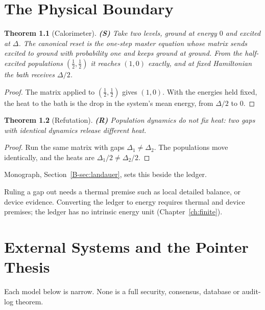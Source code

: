 \documentclass[11pt, a4paper]{report}
\theoremstyle{definition}
\theoremstyle{plain}
\newtheorem{theorem}{Theorem}[chapter]
\begin{document}
\chapter{The Physical Boundary}\label{ch:physics}

\begin{theorem}[Calorimeter] \textbf{(S)}
Take two levels, ground at energy $0$ and excited at $\Delta$. The canonical reset is the one-step
master equation whose matrix sends excited to ground with probability one and keeps ground at
ground. From the half-excited populations $(\tfrac12, \tfrac12)$ it reaches $(1, 0)$ exactly, and at
fixed Hamiltonian the bath receives $\Delta/2$.
\end{theorem}
\begin{proof}
The matrix applied to $(\tfrac12,\tfrac12)$ gives $(1,0)$. With the energies held fixed, the heat
to the bath is the drop in the system's mean energy, from $\Delta/2$ to $0$.
\end{proof}

\begin{theorem}[Refutation] \textbf{(R)}
Population dynamics do not fix heat: two gaps with identical dynamics release different heat.
\end{theorem}
\begin{proof}
Run the same matrix with gaps $\Delta_1 \ne \Delta_2$. The populations move identically, and the
heats are $\Delta_1/2 \ne \Delta_2/2$.
\end{proof}
\noindent Monograph, Section~\ref{B-sec:landauer}, sets this beside the ledger.

Ruling a gap out needs a thermal premise such as local detailed balance, or device evidence. Converting the ledger to energy requires thermal and device premises; the ledger has no intrinsic energy unit (Chapter~\ref{ch:finite}).

\chapter{External Systems and the Pointer Thesis}\label{ch:external}

Each model below is narrow. None is a full security, consensus, database or audit-log theorem.
\end{document}
